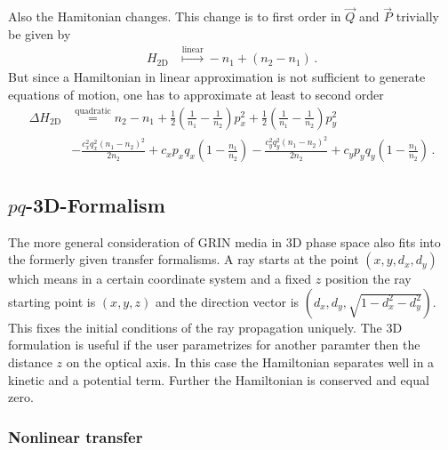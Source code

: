 \documentclass[12pt,a4paper,twoside,openright,BCOR10mm,headsepline,titlepage,abstracton,chapterprefix,final]{scrreprt}
\begin{document}
Also the Hamitonian changes. This change is to first order in $\vec{Q}$ and $\vec{P}$ trivially
be given by
\begin{align}
 H_\text{2D} & \stackrel{\text{linear}}{\mapsto} -n_1 + (n_2 - n_1)\,.
\end{align}
But since a Hamiltonian in linear approximation is not sufficient to generate equations of motion,
one has to approximate at least to second order
\begin{align}
 \Delta H_\text{2D} &\stackrel{\text{quadratic}}{=} n_2-n_1
   +\frac{1}{2} \left(\frac{1}{n_1}-\frac{1}{n_2}\right) p_x^2
   + \frac{1}{2}  \left(\frac{1}{n_1}-\frac{1}{n_2}\right) p_y^2 \nonumber\\&
  -\frac{c_x^2 q_x^2 (n_1-n_2)^2}{2 n_2}+c_x p_x q_x \left(1-\frac{n_1}{n_2}\right)
   -\frac{c_y^2 q_y^2 (n_1-n_2)^2}{2 n_2}+c_y p_y q_y \left(1-\frac{n_1}{n_2}\right)
\,.
\end{align}


\subsection{$pq$-3D-Formalism}

The more general consideration of GRIN media in 3D phase space also fits into the formerly given transfer formalisms.
A ray starts at the point $(x,y,d_x,d_y)$ which means in a certain coordinate system
and a fixed $z$ position the ray starting point is $(x,y,z)$ and the direction vector
is $(d_x,d_y,\sqrt{1-d_x^2-d_y^2})$. This fixes the initial conditions of the ray propagation
uniquely. The 3D formulation is useful if the user parametrizes for another paramter then the distance $z$ on the optical
axis. In this case the Hamiltonian separates well in a kinetic and a potential term. Further the Hamiltonian is conserved and
equal zero.

\subsubsection{Nonlinear transfer}
\end{document}
